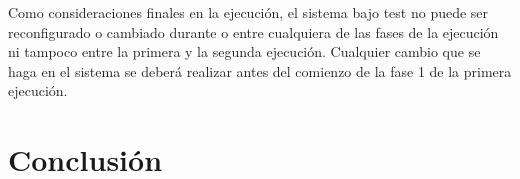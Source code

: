 \documentclass[10pt]{article}
\begin{document}
		Como consideraciones finales en la ejecución, el sistema bajo test no puede ser reconfigurado o cambiado durante o entre cualquiera de las fases de la ejecución ni tampoco entre la primera y la segunda ejecución. Cualquier cambio que se haga en el sistema se deberá realizar antes del comienzo de la fase 1 de la primera ejecución. 


\section{Conclusión} \label{sec:conclusion}


\printbibliography
\end{document}
